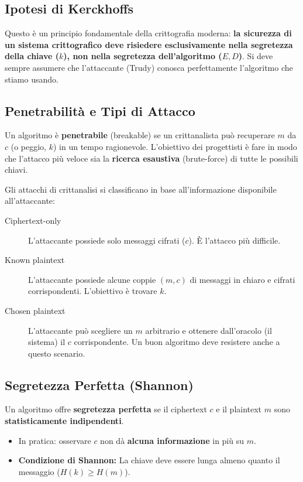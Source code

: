 \documentclass[../main.tex]{subfiles}
\begin{document}
\subsection{Ipotesi di Kerckhoffs}
Questo è un principio fondamentale della crittografia moderna: \textbf{la sicurezza di un sistema crittografico deve risiedere esclusivamente nella segretezza della chiave ($k$), non nella segretezza dell'algoritmo ($E, D$)}.
Si deve sempre assumere che l'attaccante (Trudy) conosca perfettamente l'algoritmo che stiamo usando.


\subsection{Penetrabilità e Tipi di Attacco}
Un algoritmo è \textbf{penetrabile} (breakable) se un crittanalista può recuperare $m$ da $c$ (o peggio, $k$) in un tempo ragionevole. L'obiettivo dei progettisti è fare in modo che l'attacco più veloce sia la \textbf{ricerca esaustiva} (brute-force) di tutte le possibili chiavi.

Gli attacchi di crittanalisi si classificano in base all'informazione disponibile all'attaccante:
\begin{description}
    \item[Ciphertext-only] L'attaccante possiede solo messaggi cifrati ($c$). È l'attacco più difficile.
    \item[Known plaintext] L'attaccante possiede alcune coppie $(m, c)$ di messaggi in chiaro e cifrati corrispondenti. L'obiettivo è trovare $k$.
    \item[Chosen plaintext] L'attaccante può scegliere un $m$ arbitrario e ottenere dall'oracolo (il sistema) il $c$ corrispondente. Un buon algoritmo deve resistere anche a questo scenario.
\end{description}


\subsection{Segretezza Perfetta (Shannon)}
Un algoritmo offre \textbf{segretezza perfetta} se il ciphertext $c$ e il plaintext $m$ sono \textbf{statisticamente indipendenti}.
\begin{itemize}
    \item In pratica: osservare $c$ non dà \textbf{alcuna informazione} in più su $m$.
    \item \textbf{Condizione di Shannon:} La chiave deve essere lunga almeno quanto il messaggio ($H(k) \ge H(m)$).
\end{itemize}
\end{document}
